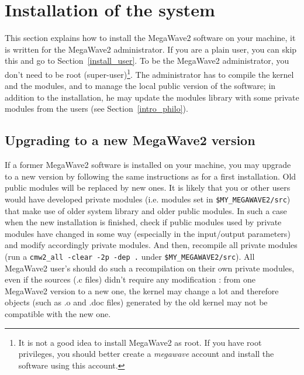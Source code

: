 %
%

\section{Installation of the system}
\label{install_system}

This section explains how to install the MegaWave2 software on your machine, it is written for the MegaWave2 administrator.
If you are a plain user, you can skip this and go to Section~\ref{install_user}.
To be the MegaWave2 administrator, you don't need to be root (super-user)\footnote{It is not a good idea to install MegaWave2 as root. If you have root privileges, you should better create a {\em megawave} account and install the
software using this account.}.
The administrator has to compile the kernel and the modules, and to manage the local public version of the software; in 
addition to the installation, he may update the modules library with some private modules
from the users (see Section~\ref{intro_philo}).


\subsection{Upgrading to a new MegaWave2 version}
\label{upgrading_megawave2}

If a former MegaWave2 software is installed on your machine, you may upgrade to a new version 
by following the same instructions as for a first installation. Old public modules will be
replaced by new ones. It is likely that you or other users would have developed private 
modules (i.e. modules set in \verb+$MY_MEGAWAVE2/src+) that make use of older system library
and older public modules. In such a case when the new installation is finished,
check if public modules used by private modules have changed in some way (especially in the 
input/output parameters) and modify accordingly private modules. And then, recompile all
private modules (run a \verb+cmw2_all -clear -2p -dep .+ under \verb+$MY_MEGAWAVE2/src+).
All MegaWave2 user's should do such a recompilation on their own private modules, even if the
sources (.c files) didn't require any modification : from one MegaWave2 version to a new one, 
the kernel may change a lot and therefore objects (such as .o and .doc files) generated by the 
old kernel may not be compatible with the new one.


